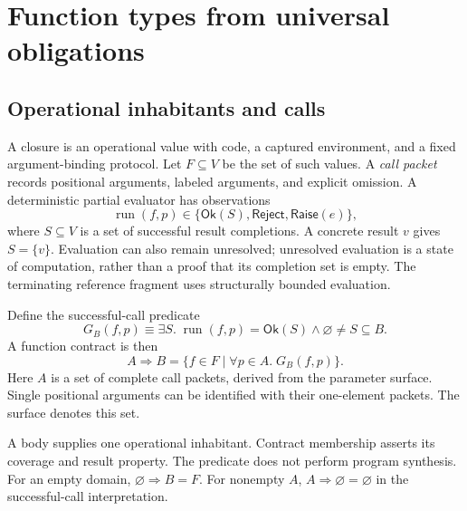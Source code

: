 \documentclass[11pt,a4paper,oneside]{report}
\newcommand{\code}[1]{\texttt{\detokenize{#1}}}
\newcommand{\Run}{\operatorname{run}}
\newcommand{\Ok}{\mathsf{Ok}}
\newcommand{\Reject}{\mathsf{Reject}}
\newcommand{\Raise}{\mathsf{Raise}}
\theoremstyle{remark}
\begin{document}
\chapter{Function types from universal obligations}
\label{ch:functions}
\section{Operational inhabitants and calls}
A closure is an operational value with code, a captured environment, and a fixed
argument-binding protocol. Let $F\subseteq V$ be the set of such values. A
\emph{call packet} records positional arguments, labeled arguments, and explicit
omission. A deterministic partial evaluator has observations
\[
 \Run(f,p)\in\{\Ok(S),\Reject,\Raise(e)\},
\]
where $S\subseteq V$ is a set of successful result completions. A concrete result
$v$ gives $S=\{v\}$. Evaluation can also remain unresolved; unresolved evaluation
is a state of computation, rather than a proof that its completion set is empty.
The terminating reference fragment uses structurally bounded evaluation.

Define the successful-call predicate
\[
 G_B(f,p)\equiv
 \exists S.\;\Run(f,p)=\Ok(S)\land\varnothing\ne S\subseteq B.
\]
A function contract is then
\begin{equation}
 A\Rightarrow B
 =\{f\in F\mid\forall p\in A.\;G_B(f,p)\}.\label{eq:arrow}
\end{equation}
Here $A$ is a set of complete call packets, derived from the parameter surface.
Single positional arguments can be identified with their one-element packets.
The surface \code{func(A) -> B} denotes this set.

A body supplies one operational inhabitant. Contract membership asserts its
coverage and result property. The predicate does not perform program synthesis.
For an empty domain, $\varnothing\Rightarrow B=F$. For nonempty $A$,
$A\Rightarrow\varnothing=\varnothing$ in the successful-call interpretation.
\end{document}
